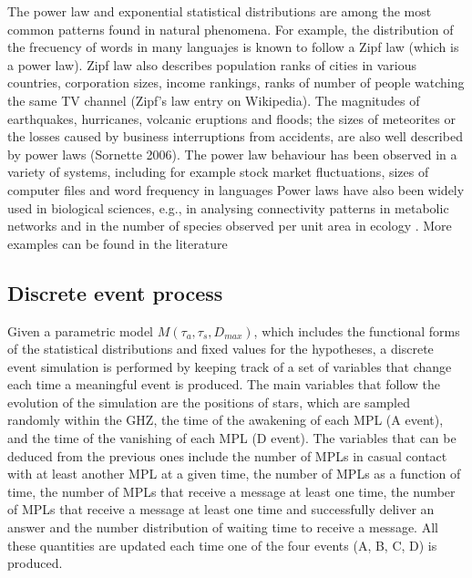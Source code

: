 The power law and exponential statistical distributions are among the
most common patterns found in natural phenomena.
%
For example, the distribution of the frecuency of words in many
languajes is known to follow a Zipf law (which is a power law).
%
Zipf law also describes population ranks of cities in various
countries, corporation sizes, income rankings, ranks of number of
people watching the same TV channel (Zipf's law entry on Wikipedia).
%
The magnitudes of earthquakes, hurricanes, volcanic eruptions and
floods; the sizes of meteorites or the losses caused by business
interruptions from accidents, are also well described by power laws
(Sornette 2006).
%
The power law behaviour has been observed in a variety of systems,
including for example stock market fluctuations, sizes of computer
files and word frequency in languages \citep{mitzenmacher_brief_2004,
newman_power_2005, simkin_theory_2006}
%
Power laws have also been widely used in biological sciences, e.g., in
analysing connectivity patterns in metabolic networks
\citep{jeong_large_2000} and in the number of species observed per
unit area in ecology \citep{martin_origin_2006, frank_common_2009}.
% 
More examples can be found in the literature
\citep{martin_origin_2006, maccone_KLT_2010, barabasi_scale_2009,
maccone_evolution_2014, maccone_lognormals_2014,
benguigui_classificacion_2016}
 


\subsection{Discrete event process}

Given a parametric model $M(\tau_a, \tau_s, D_{max})$, which includes
the functional forms of the statistical distributions and fixed values
for the hypotheses, a discrete event simulation is performed by
keeping track of a set of variables that change each time a meaningful
event is produced.
%
The main variables that follow the evolution of the simulation are the
positions of stars, which are sampled randomly within the GHZ, the
time of the awakening of each MPL (A event), and the time of the
vanishing of each MPL (D event).
%
The variables that can be deduced from the previous ones include the
number of MPLs in casual contact with at least another MPL at a given
time, the number of MPLs as a function of time, the number of MPLs
that receive a message at least one time, the number of MPLs that
receive a message at least one time and successfully deliver an answer
and the number distribution of waiting time to receive a message.
%
All these quantities are updated each time one of the four events (A,
B, C, D) is produced.
          
